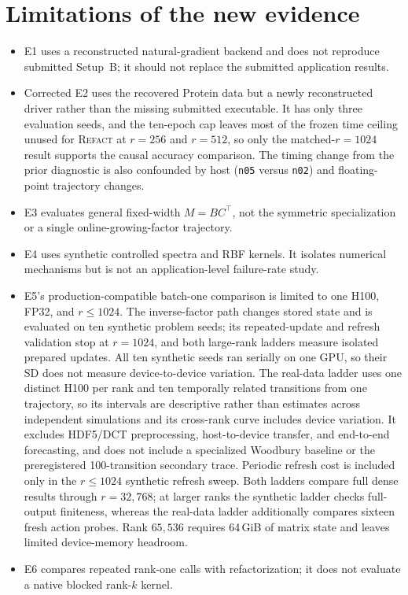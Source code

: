 \documentclass[11pt]{article}
\newcommand{\refact}{\textsc{Refact}}
\begin{document}
\section{Limitations of the new evidence}

{\small
\begin{itemize}
  \item E1 uses a reconstructed natural-gradient backend and does not
  reproduce submitted Setup~B; it should not replace the submitted
  application results.
  \item Corrected E2 uses the recovered Protein data but a newly reconstructed
  driver rather than the missing submitted executable.  It has only three
  evaluation seeds, and the ten-epoch cap leaves most of the frozen time
  ceiling unused for \refact{} at \(r=256\) and \(r=512\), so only the
  matched-\(r=1024\) result supports the causal accuracy comparison.  The
  timing change from the prior diagnostic is also confounded by host
  (\texttt{n05} versus \texttt{n02}) and floating-point trajectory changes.
  \item E3 evaluates general fixed-width \(M=BC^\top\), not the symmetric
  specialization or a single online-growing-factor trajectory.
  \item E4 uses synthetic controlled spectra and RBF kernels.  It isolates
  numerical mechanisms but is not an application-level failure-rate study.
  \item E5's production-compatible batch-one comparison is limited to one
  H100, FP32, and \(r\le1024\).  The inverse-factor path changes stored state
  and is evaluated on ten synthetic problem seeds; its repeated-update and
  refresh validation stop at \(r=1024\), and both large-rank ladders measure
  isolated prepared updates.  All ten synthetic seeds ran serially on one
  GPU, so their SD does not measure device-to-device variation.  The real-data
  ladder uses one distinct H100 per rank and ten temporally related
  transitions from one trajectory, so its intervals are descriptive rather
  than estimates across independent simulations and its cross-rank curve
  includes device variation.  It excludes HDF5/DCT preprocessing,
  host-to-device transfer, and end-to-end forecasting, and does not include a
  specialized Woodbury baseline or the preregistered 100-transition secondary
  trace.  Periodic refresh cost is included only in the \(r\le1024\)
  synthetic refresh sweep.  Both ladders compare full dense results through
  \(r=32{,}768\); at larger ranks the synthetic ladder checks full-output
  finiteness, whereas the real-data ladder additionally compares sixteen
  fresh action probes.  Rank \(65{,}536\) requires 64\,GiB of matrix state and
  leaves limited device-memory headroom.
  \item E6 compares repeated rank-one calls with refactorization; it does not
  evaluate a native blocked rank-\(k\) kernel.
\end{itemize}
}
\end{document}

